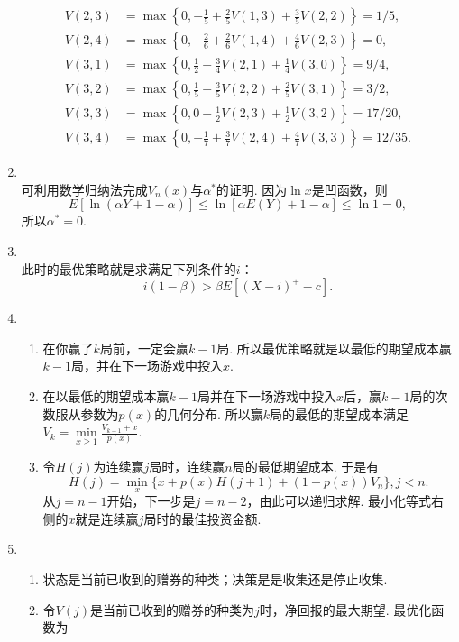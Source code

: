 \begin{enumerate}[label=\arabic{section}.\arabic*]
\begin{align*}
        V (2, 3) & = \max\left\{0, -\frac{1}{5} + \frac{2}{5}V(1,3)+\frac{3}{5}V(2,2)\right\} = 1/5,\\
        V (2, 4) & = \max\left\{0, -\frac{2}{6} + \frac{2}{6}V(1,4)+\frac{4}{6}V(2,3)\right\} = 0,\\
        V (3, 1) & = \max\left\{0, \frac{1}{2} + \frac{3}{4}V(2,1)+\frac{1}{4}V(3,0)\right\} = 9/4,\\
        V (3, 2) & = \max\left\{0, \frac{1}{5} + \frac{3}{5}V(2,2)+\frac{2}{5}V(3,1)\right\} = 3/2,\\
        V (3, 3) & = \max\left\{0, 0 + \frac{1}{2}V(2,3)+\frac{1}{2}V(3,2)\right\} = 17/20,\\
        V (3, 4) & = \max\left\{0, -\frac{1}{7} + \frac{3}{7}V(2,4)+\frac{4}{7}V(3,3)\right\} = 12/35.
    \end{align*}
    \item \pro\\
    可利用数学归纳法完成$V_n(x)$与$\alpha^*$的证明. 因为$\ln x$是凹函数，则
    \[E[\ln(\alpha Y+1-\alpha)] \leq \ln[\alpha E(Y)+1-\alpha] \leq \ln 1=0,\]
    所以$\alpha^*=0$.
    \item \sol {\kaishu \textcolor{blue}{注意：这里题干有误，应该是例12.2a.}}\\
    此时的最优策略就是求满足下列条件的$i$：
    \[i(1-\beta)>\beta E[(X-i)^+-c].\]
    \item \sol
    \begin{enumerate}[label=\alph*)]
        \item 在你赢了$k$局前，一定会赢$k-1$局. 所以最优策略就是以最低的期望成本赢$k-1$局，并在下一场游戏中投入$x$.
        \item 在以最低的期望成本赢$k-1$局并在下一场游戏中投入$x$后，赢$k-1$局的次数服从参数为$p(x)$的几何分布. 所以赢$k$局的最低的期望成本满足$\displaystyle V_k=\min\limits_{x \geq 1}\frac{V_{k-1}+x}{p(x)}$.
        \item 令$H(j)$为连续赢$j$局时，连续赢$n$局的最低期望成本. 于是有
        \[H(j)=\min_x\{x + p(x)H(j + 1) + (1 - p(x))V_n\}, j < n.\]
        从$j=n-1$开始，下一步是$j=n-2$，由此可以递归求解. 最小化等式右侧的$x$就是连续赢$j$局时的最佳投资金额.
    \end{enumerate}
    \item \sol
    \begin{enumerate}[label=\alph*)]
        \item 状态是当前已收到的赠券的种类；决策是是收集还是停止收集.
        \item 令$V(j)$是当前已收到的赠券的种类为$j$时，净回报的最大期望. 最优化函数为

\end{enumerate}
\end{enumerate}
